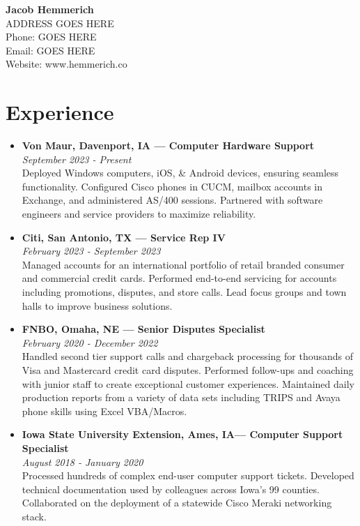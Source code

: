 \documentclass[letterpaper,9pt]{article}
\begin{document}

\begin{center}
\textbf{\Large Jacob Hemmerich} \\
ADDRESS GOES HERE \\
Phone: GOES HERE \\
Email: GOES HERE \\
Website: www.hemmerich.co
\end{center}

\section*{Experience}
\begin{itemize}
\item[] \textbf{Von Maur, Davenport, IA — Computer Hardware Support} \\
\textit{September 2023 - Present} \\
Deployed Windows computers, iOS, \& Android devices, ensuring seamless functionality. Configured Cisco phones in CUCM, mailbox accounts in Exchange, and administered AS/400 sessions. Partnered with software engineers and service providers to maximize reliability.

\item[] \textbf{Citi, San Antonio, TX — Service Rep IV} \\
\textit{February 2023 - September 2023} \\
Managed accounts for an international portfolio of retail branded consumer and commercial credit cards. Performed end-to-end servicing for accounts including promotions, disputes, and store calls. Lead focus groups and town halls to improve business solutions.

\item[] \textbf{FNBO, Omaha, NE — Senior Disputes Specialist} \\
\textit{February 2020 - December 2022} \\
Handled second tier support calls and chargeback processing for thousands of Visa and Mastercard credit card disputes. Performed follow-ups and coaching with junior staff to create exceptional customer experiences. Maintained daily production reports from a variety of data sets including TRIPS and Avaya phone skills using Excel VBA/Macros.

\item[] \textbf{Iowa State University Extension, Ames, IA— Computer Support Specialist} \\
\textit{August 2018 - January 2020} \\
Processed hundreds of complex end-user computer support tickets. Developed technical documentation used by colleagues across Iowa’s 99 counties. Collaborated on the deployment of a statewide Cisco Meraki networking stack.
\end{itemize}
\end{document}
